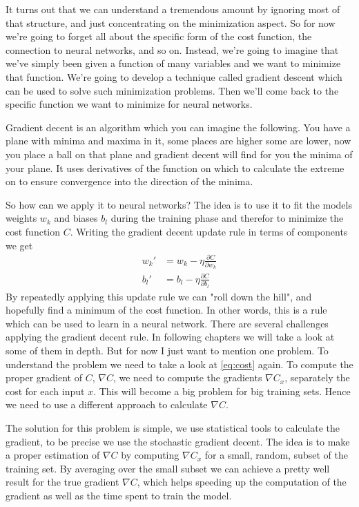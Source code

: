 \documentclass[10pt]{book}
\begin{document}
    It turns out that we can understand a tremendous amount by ignoring most of that structure, and just concentrating on the minimization aspect. So for now we're going to forget all about the specific form of the cost function, the connection to neural networks, and so on. Instead, we're going to imagine that we've simply been given a function of many variables and we want to minimize that function. We're going to develop a technique called gradient descent which can be used to solve such minimization problems. Then we'll come back to the specific function we want to minimize for neural networks.

    Gradient decent is an algorithm which you can imagine the following.
    You have a plane with minima and maxima in it, some places are higher some are lower, now you place a ball on that plane and gradient decent will find for you the minima of your plane. It uses
    derivatives of the function on which to calculate the extreme on to ensure convergence into the direction of the minima.

    So how can we apply it to neural networks? The idea is to use it to fit the models weights \(w_k\) and biases \(b_l\) during the training phase and therefor to minimize the cost function \(C\).
    Writing the gradient decent update rule in terms of components we get
    \begin{align}
        w_k' &= w_k - \eta \frac{\partial C}{\partial w_k}\\
        b_l' &= b_l - \eta \frac{\partial C}{\partial b_l}
        \label{eq:gradient-decent}
    \end{align}
    By repeatedly applying this update rule we can "roll down the hill", and hopefully find a minimum of the cost function. In other words, this is a rule which can be used to learn in a neural network.\newline
    There are several challenges applying the gradient decent rule. In following chapters we will take a look at some of them in depth.
    But for now I just want to mention one problem. To understand the problem we need to take a look at \eqref{eq:cost} again.
    To compute the proper gradient of \(C\), \(\nabla C\), we need to compute the gradients \(\nabla C_x\), separately the cost for each input \(x\). This will become a big problem
    for big training sets. Hence we need to use a different approach to calculate \(\nabla C\).

    The solution for this problem is simple, we use statistical tools to calculate the gradient, to be precise we use the stochastic gradient decent.
    The idea is to make a proper estimation of \(\nabla C\) by computing \(\nabla C_x\) for a small, random, subset of the training set.
    By averaging over the small subset we can achieve a pretty well result for the true gradient \(\nabla C\), which helps speeding up the computation of the gradient as well as the time spent to train the model.
\end{document}
